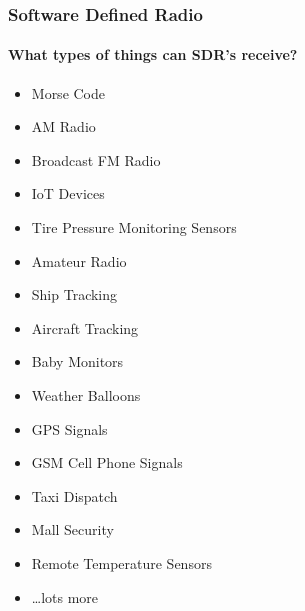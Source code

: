 \documentclass[]{beamer}
\begin{document}
\begin{frame}
    \frametitle{Software Defined Radio}
    \framesubtitle{What types of things can SDR's receive?}
    \begin{itemize}
        \item Morse Code
        \item AM Radio
        \item Broadcast FM Radio
        \item IoT Devices
        \item Tire Pressure Monitoring Sensors
        \item Amateur Radio
        \item Ship Tracking
        \item Aircraft Tracking
        \item Baby Monitors
        \item Weather Balloons
        \item GPS Signals
        \item GSM Cell Phone Signals
        \item Taxi Dispatch
        \item Mall Security
        \item Remote Temperature Sensors
        \item \dots lots more
    \end{itemize}
\end{frame}
\end{document}
